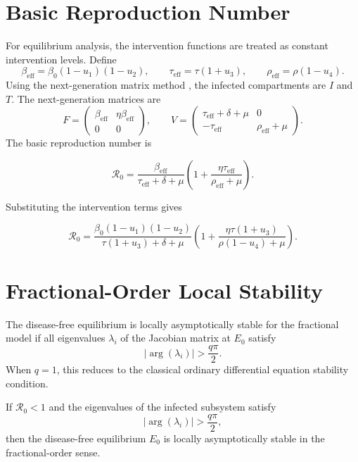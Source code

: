 \documentclass[12pt,a4paper,oneside]{report}
\newcommand{\Rzero}{\mathcal{R}_0}
\newcommand{\beff}{\beta_{\mathrm{eff}}}
\newcommand{\taueff}{\tau_{\mathrm{eff}}}
\newcommand{\rhoeff}{\rho_{\mathrm{eff}}}
\begin{document}
\section{Basic Reproduction Number}
For equilibrium analysis, the intervention functions are treated as constant intervention levels. Define
\[
\beff=\beta_0(1-u_1)(1-u_2),\qquad
\taueff=\tau(1+u_3),\qquad
\rhoeff=\rho(1-u_4).
\]
Using the next-generation matrix method \citep{VanDenDriessche2002}, the infected compartments are $I$ and $T$. The next-generation matrices are
\[
F=\begin{pmatrix}
\beff & \eta\beff\\
0&0
\end{pmatrix},
\qquad
V=\begin{pmatrix}
\taueff+\delta+\mu & 0\\
-\taueff & \rhoeff+\mu
\end{pmatrix}.
\]
The basic reproduction number is
\begin{mathbox}
\begin{equation}
\Rzero=
\frac{\beff}{\taueff+\delta+\mu}
\left(1+\frac{\eta\taueff}{\rhoeff+\mu}\right).
\label{eq:R0_fractional}
\end{equation}
\end{mathbox}
Substituting the intervention terms gives
\begin{mathbox}
\begin{equation}
\Rzero=
\frac{\beta_0(1-u_1)(1-u_2)}{\tau(1+u_3)+\delta+\mu}
\left(1+\frac{\eta\tau(1+u_3)}{\rho(1-u_4)+\mu}\right).
\end{equation}
\end{mathbox}

\section{Fractional-Order Local Stability}
The disease-free equilibrium is locally asymptotically stable for the fractional model if all eigenvalues $\lambda_i$ of the Jacobian matrix at $E_0$ satisfy
\begin{equation}
|\arg(\lambda_i)|>\frac{q\pi}{2}.
\end{equation}
When $q=1$, this reduces to the classical ordinary differential equation stability condition.

\begin{resultbox}[title={Fractional Stability Result}]
If $\Rzero<1$ and the eigenvalues of the infected subsystem satisfy
\[
|\arg(\lambda_i)|>\frac{q\pi}{2},
\]
then the disease-free equilibrium $E_0$ is locally asymptotically stable in the fractional-order sense.
\end{resultbox}
\end{document}
